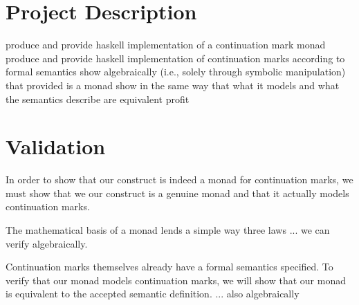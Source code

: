 \documentclass[ms]{byuprop}
\begin{document}




\section{Project Description}

produce and provide haskell implementation of a continuation mark monad
produce and provide haskell implementation of continuation marks according to formal semantics
show algebraically (i.e., solely through symbolic manipulation) that provided is a monad
show in the same way that what it models and what the semantics describe are equivalent
profit

\section{Validation}


In order to show that our construct is indeed a monad for continuation marks, we must show that we our construct is a genuine monad and that it actually models continuation marks.

The mathematical basis of a monad lends a simple way three laws ... we can verify algebraically.

Continuation marks themselves already have a formal semantics specified. To verify that our monad models continuation marks, we will show that our monad is equivalent to the accepted semantic definition. ... also algebraically



\end{document}
